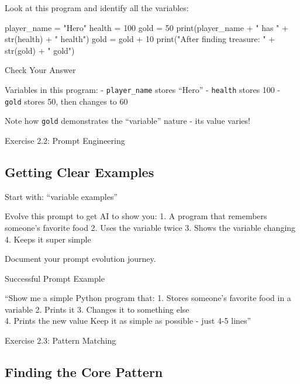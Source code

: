 \documentclass[
  letterpaper,
  DIV=11,
  numbers=noendperiod,
  oneside]{scrreprt}
\newenvironment{Shaded}{}{}
\newcommand{\BuiltInTok}[1]{\textcolor[rgb]{0.84,0.23,0.29}{#1}}
\newcommand{\DecValTok}[1]{\textcolor[rgb]{0.00,0.36,0.77}{#1}}
\newcommand{\NormalTok}[1]{\textcolor[rgb]{0.14,0.16,0.18}{#1}}
\newcommand{\OperatorTok}[1]{\textcolor[rgb]{0.14,0.16,0.18}{#1}}
\newcommand{\StringTok}[1]{\textcolor[rgb]{0.01,0.18,0.38}{#1}}
\begin{document}
Look at this program and identify all the variables:

\begin{Shaded}
\begin{Highlighting}[]
\NormalTok{player\_name }\OperatorTok{=} \StringTok{"Hero"}
\NormalTok{health }\OperatorTok{=} \DecValTok{100}
\NormalTok{gold }\OperatorTok{=} \DecValTok{50}
\BuiltInTok{print}\NormalTok{(player\_name }\OperatorTok{+} \StringTok{" has "} \OperatorTok{+} \BuiltInTok{str}\NormalTok{(health) }\OperatorTok{+} \StringTok{" health"}\NormalTok{)}
\NormalTok{gold }\OperatorTok{=}\NormalTok{ gold }\OperatorTok{+} \DecValTok{10}
\BuiltInTok{print}\NormalTok{(}\StringTok{"After finding treasure: "} \OperatorTok{+} \BuiltInTok{str}\NormalTok{(gold) }\OperatorTok{+} \StringTok{" gold"}\NormalTok{)}
\end{Highlighting}
\end{Shaded}

Check Your Answer

Variables in this program: - \texttt{player\_name} stores ``Hero'' -
\texttt{health} stores 100 - \texttt{gold} stores 50, then changes to 60

Note how \texttt{gold} demonstrates the ``variable'' nature - its value
varies!

Exercise 2.2: Prompt Engineering

\subsection{Getting Clear Examples}\label{getting-clear-examples}

Start with: ``variable examples''

Evolve this prompt to get AI to show you: 1. A program that remembers
someone's favorite food 2. Uses the variable twice 3. Shows the variable
changing 4. Keeps it super simple

Document your prompt evolution journey.

Successful Prompt Example

``Show me a simple Python program that: 1. Stores someone's favorite
food in a variable 2. Prints it 3. Changes it to something else\\
4. Prints the new value Keep it as simple as possible - just 4-5 lines''

Exercise 2.3: Pattern Matching

\subsection{Finding the Core Pattern}\label{finding-the-core-pattern}
\end{document}
